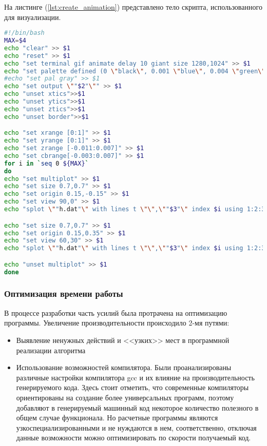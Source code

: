 На листинге (\ref{lst:create_animation}) представлено тело скрипта, использованного для визуализации.


\begin{lstlisting}[language=bash,caption=Пример скрипта для визуализации,label={lst:create_animation}]
#!/bin/bash
MAX=$4
echo "clear" >> $1
echo "reset" >> $1
echo "set terminal gif animate delay 10 giant size 1280,1024" >> $1
echo "set palette defined (0 \"black\", 0.001 \"blue\", 0.004 \"green\",0.006 \"yellow\",0.007 \"red\")" >> $1
#echo "set pal gray" >> $1
echo "set output \""$2"\"" >> $1
echo "unset xtics">>$1
echo "unset ytics">>$1
echo "unset ztics">>$1
echo "unset border">>$1

echo "set xrange [0:1]" >> $1
echo "set yrange [0:1]" >> $1
echo "set zrange [-0.011:0.007]" >> $1
echo "set cbrange[-0.003:0.007]" >> $1
for i in `seq 0 ${MAX}`
do
echo "set multiplot" >> $1
echo "set size 0.7,0.7" >> $1
echo "set origin 0.15,-0.15" >> $1
echo "set view 90,0" >> $1
echo "splot \""h.dat"\" with lines t \"\",\""$3"\" index $i using 1:2:3 with pm3d t \"\"" >> $1

echo "set size 0.7,0.7" >> $1
echo "set origin 0.15,0.35" >> $1
echo "set view 60,30" >> $1
echo "splot \""h.dat"\" with lines t \"\",\""$3"\" index $i using 1:2:3 with pm3d lc rgb \"black\" t \"\"" >> $1

echo "unset multiplot" >> $1
done
\end{lstlisting}

\addtocounter{subsubsection}{1}
\subsubsection*{Оптимизация времени работы}

В процессе разработки часть усилий была протрачена на оптимизацию программы. Увеличение производительности происходило 2-мя путями:
\begin{itemize}
    \item Выявление ненужных действий и <<узких>> мест в программной реализации алгоритма
    \item Использование возможностей компилятора. Были проанализированы различные настройки компилятора gcc и их влияние на производительность генерируемого кода. Здесь стоит отметить, что современные компиляторы ориентированы на создание более универсальных программ, поэтому добавляют в генерируемый машинный код некоторое количество полезного в общем случае функционала. Но расчетные программы являются узкоспециализированными и не нуждаются в нем, соответственно, отключая данные возможности можно оптимизировать по скорости получаемый код.
\end{itemize}

